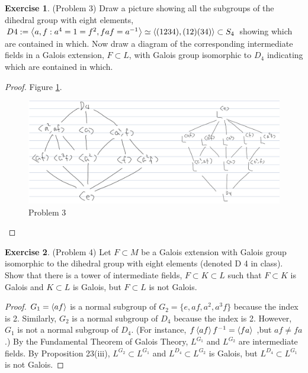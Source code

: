 \documentclass[12pt, psamsfonts]{amsart}
\theoremstyle{definition}
\newtheorem*{exer}{Exercise}
\theoremstyle{remark}
\numberwithin{equation}{section}
\begin{document}
\begin{exer}{(Problem 3)}
  Draw a picture showing all the subgroups of the dihedral group with eight elements, $D4 := \ev{a , f: a^4 = 1 = f^2, faf = a^{-1}} \simeq \ev{(1234),(12)(34)} \subset S_4$ showing which are contained in which.
  Now draw a diagram of the corresponding intermediate fields in a Galois extension, $F \subset L$, with Galois group isomorphic to $D_4$ indicating which are ¢ontained in which.
\end{exer}

\begin{proof}
  Figure \ref{fig:problem3}.
  \begin{figure}
    \includegraphics[width=\linewidth]{problem3.jpg}
    \caption{Problem 3}
    \label{fig:problem3}
  \end{figure}
\end{proof}

\begin{exer}{(Problem 4)}
  Let $F \subset M$ be a Galois extension with Galois group isomorphic to the dihedral group with eight elements (denoted D 4 in class).
  Show that there is a tower of intermediate fields, $F \subset K \subset L$ such that $F \subset K$ is Galois and $K \subset L$ is Galois, but $F \subset L$ is not Galois.
\end{exer}

\begin{proof}
  $G_1 = \ev{af}$ is a normal subgroup of $G_2 = \{ e, af, a^2, a^3f \}$ because the index is 2.
  Similarly, $G_2$ is a normal subgroup of $D_4$ because the index is 2.
  However, $G_1$ is not a normal subgroup of $D_4$.
  (For instance, $f\ev{af}f^{-1} = \ev{fa}$ ,but $af \ne fa$.)
  By the Fundamental Theorem of Galois Theory, $L^{G_1}$ and $L^{G_2}$ are intermediate fields.
  By Proposition 23(iii), $L^{G_2} \subset L^{G_1}$ and $L^{D_4} \subset L^{G_2}$ is Galois, but $L^{D_4} \subset L^{G_1}$ is not Galois.
\end{proof}
\end{document}
